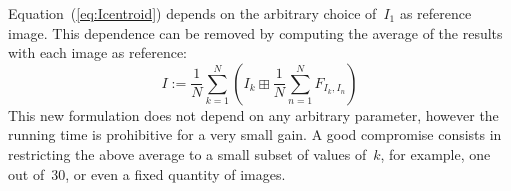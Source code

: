 \documentclass{ipol}
\begin{document}

Equation~(\ref{eq:Icentroid}) depends on the arbitrary choice of~$I_1$ as
reference image.  This dependence can be removed by computing the average of
the results with each image as reference:
\begin{equation}
	I:=\frac{1}{N}\sum_{k=1}^N\left(I_k\boxplus\frac{1}{N}\sum_{n=1}^NF_{I_k,I_n}\right)
	\label{eq:Irecentroid}
\end{equation}
This new formulation does not depend on any arbitrary parameter, however the
running time is prohibitive for a very small gain.  A good compromise consists
in restricting the above average to a small subset of values of~$k$, for
example, one out of~$30$, or even a fixed quantity of images.

\end{document}
